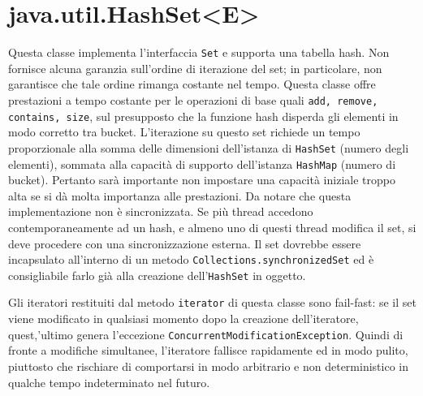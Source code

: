 		
	\section{java.util.HashSet<E>}
		Questa classe implementa l'interfaccia \lstinline|Set| e supporta una tabella hash. Non fornisce alcuna garanzia sull'ordine di iterazione del set; in particolare, non garantisce che tale ordine rimanga costante nel tempo. Questa classe offre prestazioni a tempo costante per le operazioni di base quali \lstinline|add, remove, contains, size|, sul presupposto che la funzione hash disperda gli elementi in modo corretto tra bucket. L'iterazione su questo set richiede un tempo proporzionale alla somma delle dimensioni dell'istanza di \lstinline|HashSet| (numero degli elementi), sommata alla capacità di supporto dell'istanza \lstinline|HashMap| (numero di bucket). Pertanto sarà importante non impostare una capacità iniziale troppo alta se si dà molta importanza alle prestazioni. Da notare che questa implementazione non è sincronizzata. Se più thread accedono contemporaneamente ad un hash, e almeno uno di questi thread modifica il set, si deve procedere con una sincronizzazione esterna. Il set dovrebbe essere incapsulato all'interno di un metodo \lstinline|Collections.synchronizedSet| ed è consigliabile farlo già alla creazione dell'\lstinline|HashSet| in oggetto.
		
		Gli iteratori restituiti dal metodo \lstinline|iterator| di questa classe sono fail-fast: se il set viene modificato in qualsiasi momento dopo la creazione dell'iteratore, quest,'ultimo genera l'eccezione \lstinline|ConcurrentModificationException|. Quindi di fronte a modifiche simultanee, l'iteratore fallisce rapidamente ed in modo pulito, piuttosto che rischiare di comportarsi in modo arbitrario e non deterministico in qualche tempo indeterminato nel futuro.
		
		
